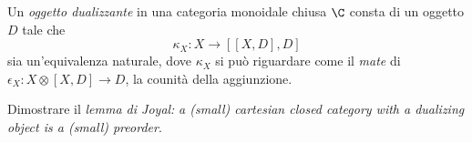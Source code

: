 \begin{df}
Un \emph{oggetto dualizzante} in una categoria monoidale chiusa $\C$ consta di un oggetto $D$ tale che
\[ \kappa_X\colon X\longrightarrow [[X,D],D]\]
sia un'equivalenza naturale, dove $\kappa_X$ si pu\`o riguardare come il \emph{mate} di $\epsilon_X\colon X\otimes [X,D]\to D$, la counit\`a della aggiunzione.
\end{df}
\begin{MyExercise}
Dimostrare il \emph{lemma di Joyal:} \emph{a (small) cartesian closed category with a dualizing object is a (small) preorder}. 
\end{MyExercise}

\newpage